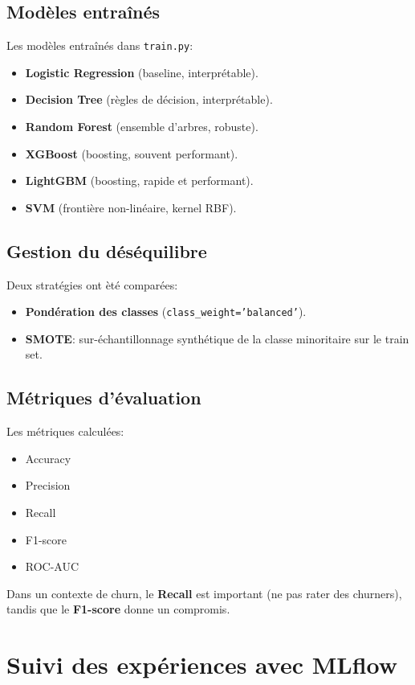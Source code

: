\documentclass[11pt,a4paper]{article}
\begin{document}
\subsection{Mod\`eles entra\^in\'es}
Les mod\`eles entra\^in\'es dans \texttt{train.py}:
\begin{itemize}
  \item \textbf{Logistic Regression} (baseline, interpr\'etable).
  \item \textbf{Decision Tree} (r\`egles de d\'ecision, interpr\'etable).
  \item \textbf{Random Forest} (ensemble d'arbres, robuste).
  \item \textbf{XGBoost} (boosting, souvent performant).
  \item \textbf{LightGBM} (boosting, rapide et performant).
  \item \textbf{SVM} (fronti\`ere non-lin\'eaire, kernel RBF).
\end{itemize}

\subsection{Gestion du d\'es\'equilibre}
Deux strat\'egies ont \`et\'e compar\'ees:
\begin{itemize}
  \item \textbf{Pond\'eration des classes} (\texttt{class\_weight='balanced'}).
  \item \textbf{SMOTE}: sur-\'echantillonnage synth\'etique de la classe minoritaire sur le train set.
\end{itemize}

\subsection{M\'etriques d'\'evaluation}
Les m\'etriques calcul\'ees:\newline
\begin{itemize}
  \item Accuracy
  \item Precision
  \item Recall
  \item F1-score
  \item ROC-AUC
\end{itemize}
Dans un contexte de churn, le \textbf{Recall} est important (ne pas rater des churners), tandis que le \textbf{F1-score} donne un compromis.

\section{Suivi des exp\'eriences avec MLflow}
\end{document}
